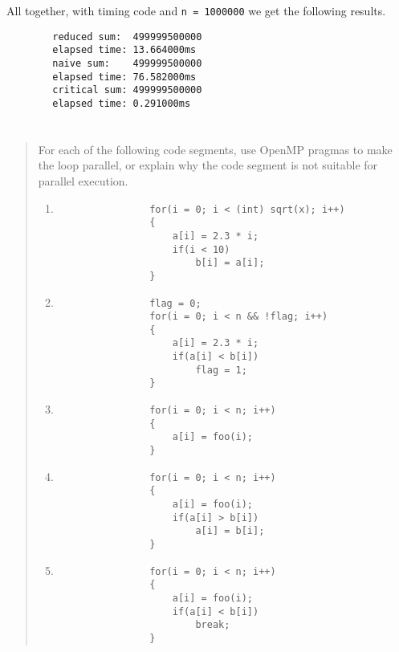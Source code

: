 \documentclass{article}
\begin{document}
    All together, with timing code and \texttt{n = 1000000} we get the following results.

    \begin{verbatim}
        reduced sum:  499999500000
        elapsed time: 13.664000ms
        naive sum:    499999500000
        elapsed time: 76.582000ms
        critical sum: 499999500000
        elapsed time: 0.291000ms
    \end{verbatim}

\section{}
    \begin{quote}
        For each of the following code segments, use OpenMP pragmas to make the loop parallel, or explain why the code segment is not suitable for parallel execution.

        \begin{enumerate}
            \item \begin{verbatim}
                for(i = 0; i < (int) sqrt(x); i++)
                {
                    a[i] = 2.3 * i;
                    if(i < 10)
                        b[i] = a[i];
                }
            \end{verbatim}

            \item \begin{verbatim}
                flag = 0;
                for(i = 0; i < n && !flag; i++)
                {
                    a[i] = 2.3 * i;
                    if(a[i] < b[i])
                        flag = 1;
                }
            \end{verbatim}

            \item \begin{verbatim}
                for(i = 0; i < n; i++)
                {
                    a[i] = foo(i);
                }
            \end{verbatim}

            \item \begin{verbatim}
                for(i = 0; i < n; i++)
                {
                    a[i] = foo(i);
                    if(a[i] > b[i])
                        a[i] = b[i];
                }
            \end{verbatim}

            \item \begin{verbatim}
                for(i = 0; i < n; i++)
                {
                    a[i] = foo(i);
                    if(a[i] < b[i])
                        break;
                }
            \end{verbatim}


\end{enumerate}
\end{quote}
\end{document}
